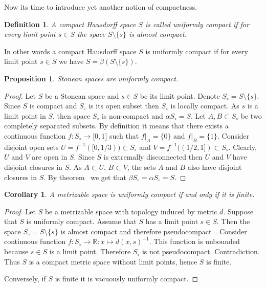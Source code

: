 \documentclass[12pt]{article}
\newtheorem{proposition}[theorem]{Proposition}
\newtheorem{corollary}[theorem]{Corollary}
\newtheorem{definition}[theorem]{Definition}
\begin{document}
Now its time to introduce yet another notion of compactness.

\begin{definition} A compact Hausdorff space $S$ is called uniformly compact if
    for every limit point $s\in S$ the space $S\setminus \{s\}$ is almost
    compact.
\end{definition}

In other words a compact Hausdorff space $S$ is uniformly compact if for every
limit point $s\in S$ we have $S=\beta(S\setminus \{s\})$.

\begin{proposition}\label{StoneSpUnifComp} Stonean spaces are uniformly compact.
\end{proposition}
\begin{proof} Let $S$ be a Stonean space and $s\in S$ be its limit point. Denote
    $S_\circ=S\setminus \{s\}$. Since $S$ is compact and $S_\circ$ is its open
    subset then $S_\circ$ is locally compact. As $s$ is a limit point in $S$,
    then space $S_\circ$ is non-compact and $\alpha S_\circ=S$. Let $A,B\subset
        S_\circ$ be two completely separated subsets. By definition it means that
    there exists a continuous function $f:S_\circ\to\mathbb[0,1]$ such that
    $f|_A=\{0\}$ and $f|_B=\{1\}$. Consider disjoint open sets
    $U=f^{-1}([0,1/3))\subset S_\circ$ and  %
    $V=f^{-1}((1/2,1])\subset S_\circ$.  %
    Clearly, $U$ and $V$ are open in $S$. Since $S$ is extremally disconnected
    then $U$ and $V$ have disjoint closures in $S$. As $A\subset U$, $B\subset
        V$, the sets $A$ and $B$ also have disjoint closures in $S$. By
    theorem~\cite[theorem 3.6.2]{EngkingGenTop} we get that $\beta
        S_\circ=\alpha S_\circ=S$.
\end{proof}

\begin{corollary}\label{MesSpUnifCompIffFin} A metrizable space is uniformly
    compact if and only if it is finite.
\end{corollary}
\begin{proof} Let $S$ be a metrizable space with topology induced by metric $d$.
    Suppose that $S$ is uniformly compact. Assume that $S$ has a limit point
    $s\in S$. Then the space $S_\circ=S\setminus \{s\}$ is almost compact and
    therefore pseudocompact~\cite[proposition 1.3.10]{HrusPsdCompTopSp}.
    Consider continuous function $f:S_\circ\to\mathbb{R}:x\mapsto
        {d(x,s)}^{-1}$. This function is unbounded because $s\in S$ is a limit
    point. Therefore $S_\circ$ is not pseudocompact. Contradiction. Thus $S$ is
    a compact metric space without limit points, hence $S$ is finite.

    Conversely, if $S$ is finite it is vacuously uniformly compact.
\end{proof}
\end{document}
